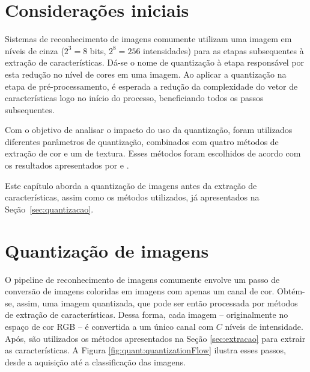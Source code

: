 \section{Considerações iniciais}

Sistemas de reconhecimento de imagens comumente utilizam uma imagem em níveis de cinza ($2^3 = 8$ bits, $2^8 = 256$ intensidades) para as etapas subsequentes à extração de características. Dá-se o nome de quantização à etapa responsável por esta redução no nível de cores em uma imagem. Ao aplicar a quantização na etapa de pré-processamento, é esperada a redução da complexidade do vetor de características logo no início do processo, beneficiando todos os passos subsequentes.

Com o objetivo de analisar o impacto do uso da quantização, foram utilizados diferentes parâmetros de quantização, combinados com quatro métodos de extração de cor e um de textura. Esses métodos foram escolhidos de acordo com os resultados apresentados por  e .

Este capítulo aborda a quantização de imagens antes da extração de características, assim como os métodos utilizados, já apresentados na Seção~\ref{sec:quantizacao}.

\section{Quantização de imagens}

O pipeline de reconhecimento de imagens comumente envolve um passo de conversão de imagens coloridas em imagens com apenas um canal de cor. Obtém-se, assim, uma imagem quantizada, que pode ser então processada por métodos de extração de características. Dessa forma, cada imagem -- originalmente no espaço de cor RGB -- é convertida a um único canal com $C$ níveis de intensidade. Após, são utilizados os métodos apresentados na Seção \ref{sec:extracao} para extrair as características. A Figura \ref{fig:quant:quantizationFlow} ilustra esses passos, desde a aquisição até a classificação das imagens.

